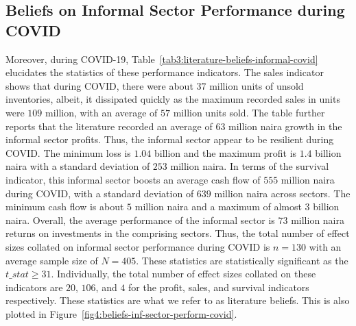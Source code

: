 \documentclass[12pt, english]{article}
\begin{document}
    \subsection{Beliefs on Informal Sector Performance during COVID}\label{subsec4.2:literature-beliefs-on-informal-sector-performance-during-covid-19}
    Moreover, during COVID-19, Table~\ref{tab3:literature-beliefs-informal-covid} elucidates the statistics of these performance indicators. The sales indicator shows that during COVID, there were about $37$ million units of unsold inventories, albeit, it dissipated quickly as the maximum recorded sales in units were $109$ million, with an average of $57$ million units sold. The table further reports that the literature recorded an average of $63$ million naira growth in the informal sector profits. Thus, the informal sector appear to be resilient during COVID. The minimum loss is $1.04$ billion and the maximum profit is $1.4$ billion naira with a standard deviation of $253$ million naira. In terms of the survival indicator, this informal sector boosts an average cash flow of $555$ million naira during COVID, with a standard deviation of $639$ million naira across sectors. The minimum cash flow is about $5$ million naira and a maximum of almost $3$ billion naira. Overall, the average performance of the informal sector is $73$ million naira returns on investments in the comprising sectors. Thus, the total number of effect sizes collated on informal sector performance during COVID is $n = 130$ with an average sample size of $N = 405$. These statistics are statistically significant as the $t\_stat \geq 31$. Individually, the total number of effect sizes collated on these indicators are $20$, $106$, and $4$ for the profit, sales, and survival indicators respectively. These statistics are what we refer to as literature beliefs. This is also plotted in Figure~\ref{fig4:beliefs-inf-sector-perform-covid}.
\end{document}
